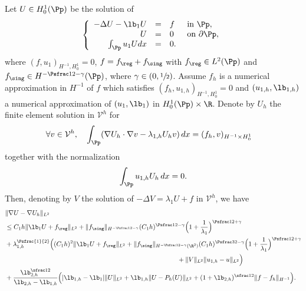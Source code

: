 \begin{thm}\label{thm:estimate-singular}
Let $U\in H^1_0(\Pp)$ be the solution of
\begin{equation}\label{bobu28.1}
\left\{ \begin{array}{rcll}
-\Delta U - \lb_1U& =&f& \text{ in } \Pp,\\
U&= &0 & \text{ on }\partial \Pp,\\
\int_{\Pp} u_1U dx&= &0.
\end{array} \right.
\end{equation}
where $(f,u_1)_{H^{-1},H_0^1} = 0$, $f= f_{\reg}+{f_{\sing}} $ with $f_{\reg} \in L^2(\Pp)$ and $f_{\sing} \in H^{-\Psfrac 12 -\gamma} (\Pp)$, where $\gamma \in (0,\sfrac{1}{2})$. Assume $f_h$ is a numerical approximation in $H^{-1}$ of $f$ which satisfies $(f_h,u_{1,h})_{H^{-1},H_0^1}=0$ and $(u_{1,h}, \lb_{1,h})$ a numerical approximation of $(u_1, \lb_1)$ in $H^1_0(\Pp)\times \R$. Denote by $U_h $ the finite element solution in $\mathcal V^h$ for
\begin{align}\forall v \in \mathcal V^h, \quad \int_{\Pp} (\nabla U_h \cdot \nabla v-\lambda_{1,h} U_hv) \, dx& =(f_h, v)_{H^{-1}\times H^1_0} \label{eq:material-eig-decomposed.h}
\end{align}
together with the normalization
\begin{equation}
\int_{\Pp} u_{1,h}U_h \, dx = 0.
\label{eq:normalization.h}
\end{equation}
Then, denoting by $V$ the solution of $-\Delta V = \lambda_1 U+f$ in $\mathcal V^h$, we have
\begin{align*}
&\|\nabla U-\nabla U_h\|_{L^2}\\
&\le C_1 h \| \lb_1 U+ f_{\reg}\|_{L^2}+ \|f_{\sing}\|_{H^{-\Psfrac 12 -\gamma}} (C_1 h)^{\Psfrac 12 -\gamma}\Bigl(1+\frac {1}{\lambda_1}\Bigr)^{\Psfrac 12 +\gamma}\\
&+ \lambda_{1,h}^{\Psfrac{1}{2}}\Big((C_1 h)^2 \| \lb_1 U+ f_{\reg}\|_{L^2}
+ \|f_{\sing}\|_{H^{-\Psfrac 12 -\gamma} (\R^2)} (C_1 h)^{\Psfrac 32 -\gamma}\Bigl(1+\frac {1}{\lambda_1}\Bigr)^{\Psfrac 12 +\gamma} \\
& \hspace*{9.3cm}+\|V\|_{L^2}\|u_{1,h}-u\|_{L^2}\Big)\\
&+\frac{\lb_{2,h}^{\sfrac 12}}{\lb_{2,h}-\lb_{1,h}} \Big (|\lb_{1,h}-\lb_1| \|U\|_{L^2} + \lb_{1,h}\|U-P_h(U)\|_{L^2}+ (1+ \lb_{2,h})^{\sfrac 12}\|f-f_h\|_{H^{-1}}\Big).
\end{align*}

\end{thm}
